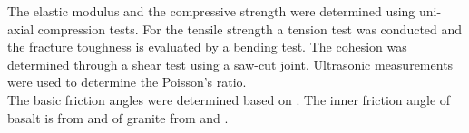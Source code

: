 The elastic modulus and the compressive strength were determined using uni-axial compression tests. For the tensile strength a tension test was conducted and the fracture toughness is evaluated by a bending test. The cohesion was determined through a shear test using a saw-cut joint. Ultrasonic measurements were used to determine the Poisson's ratio.\\
The basic friction angles were determined based on \cite{Alejano20121023}. The inner friction angle of basalt is from \cite{Schultz19951} and of granite from \cite{Lanaro2005} and \cite{Ramana2019273}.